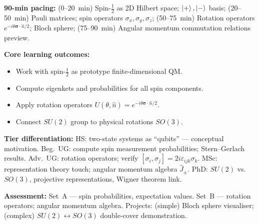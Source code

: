 \documentclass[11pt,a4paper]{article}
\begin{document}
\medskip
\begin{tcolorbox}[modulebox, title={Module~I.2 --- Lecture L10: Spin \& Finite-Dimensional Hilbert Spaces ($SU(2)$)}]
\textbf{90-min pacing:} (0--20~min) Spin-$\tfrac{1}{2}$ as 2D Hilbert space; $\ket{+},\ket{-}$ basis;
(20--50~min) Pauli matrices; spin operators $\sigma_x,\sigma_y,\sigma_z$;
(50--75~min) Rotation operators $e^{-i\theta\boldsymbol{\sigma}\cdot\hat{n}/2}$; Bloch sphere;
(75--90~min) Angular momentum commutation relations preview.

\medskip\textbf{Core learning outcomes:}
\begin{itemize}[leftmargin=1.4em,topsep=2pt,itemsep=1pt]
  \item Work with spin-$\tfrac{1}{2}$ as prototype finite-dimensional QM.
  \item Compute eigenkets and probabilities for all spin components.
  \item Apply rotation operators $U(\theta,\hat{n})=e^{-i\theta\boldsymbol{\sigma}\cdot\hat{n}/2}$.
  \item Connect $SU(2)$ group to physical rotations $SO(3)$.
\end{itemize}

\medskip\textbf{Tier differentiation:}
HS: two-state systems as ``qubits'' --- conceptual motivation.
Beg.\ UG: compute spin measurement probabilities; Stern--Gerlach results.
Adv.\ UG: rotation operators; verify $[\sigma_i,\sigma_j]=2i\varepsilon_{ijk}\sigma_k$.
MSc: representation theory touch; angular momentum algebra $\hat{J}_\pm$.
PhD: $SU(2)$ vs.\ $SO(3)$, projective representations, Wigner theorem link.

\medskip\textbf{Assessment:}
Set~A --- spin probabilities, expectation values.
Set~B --- rotation operators; angular momentum algebra.
Projects: (simple) Bloch sphere visualiser; (complex) $SU(2)\leftrightarrow SO(3)$ double-cover demonstration.
\end{tcolorbox}
\end{document}
